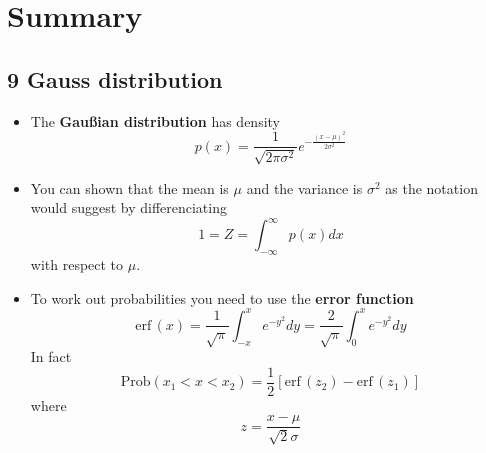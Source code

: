 \ifind
\section*{Summary}
\else
\subsection*{9 Gauss distribution}
\fi

\begin{itemize}

\item The \textbf{Gau\ss{}ian distribution} has density
  \begin{equation}
p(x)=\frac{1}{\sqrt{2\pi\sigma^2}}e^{-\frac{(x-\mu)^2}{2\sigma^2}}
  \end{equation}


\item You can  shown that the mean is $\mu$ and the variance is $\sigma^2$ as the notation would suggest by differenciating
\begin{equation}
1=Z=\int_{-\infty}^\infty p(x)dx
\end{equation}
with respect to $\mu$.


\item To work out probabilities you need to use the \textbf{error function}
  \begin{equation}
\mbox{erf}\,(x)=\frac{1}{\sqrt{\pi}}\int_{-x}^xe^{-y^2}dy=\frac{2}{\sqrt{\pi}}\int_0^xe^{-y^2}dy
  \end{equation}
  In fact
  \begin{equation}
\mbox{Prob}(x_1<x<x_2)=\frac{1}{2}[\mbox{erf}\,(z_2)-\mbox{erf}\,(z_1)]
  \end{equation}
  where
  \begin{equation}
z=\frac{x-\mu}{\sqrt{2}\sigma}
  \end{equation}
  \end{itemize}
